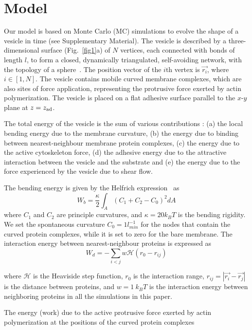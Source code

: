 \documentclass[
reprint,
superscriptaddress,
 amsmath,amssymb,
 aps,
prl,
floatfix]{revtex4-2}
\begin{document}
\section{Model} 
Our model is based on Monte Carlo (MC) simulations to evolve the shape of a vesicle in time (see Supplementary Material). The vesicle is described by a three-dimensional surface (Fig.~\ref{fig1}a) of $N$ vertices, each connected with bonds of length $l$, to form a closed, dynamically triangulated, self-avoiding network, with the topology of a sphere~\cite{Fonari2019}.
The position vector of the $i$th vertex is $\overrightarrow{r_i}$, where $i\in[1, N]$. The vesicle contains mobile curved membrane complexes, which are also sites of force application, representing the protrusive force exerted by actin polymerization. The vesicle is placed on a flat adhesive surface parallel to the $x$-$y$ plane at $z=z_{\rm ad}$. 

The total energy of the vesicle is the sum of various contributions \cite{sadhu2021modelling}: (a) the local bending energy due to the membrane curvature, (b) the energy due to binding between nearest-neighbour membrane protein complexes, (c) the energy due to the active cytoskeleton force, (d) the adhesive energy due to the attractive interaction between the vesicle and the substrate and (e) the energy due to the force experienced by the vesicle due to shear flow.

The bending energy is given by the Helfrich expression~\cite{Helfrich1973} as
\begin{equation}
    W_b=\frac{\kappa}{2}\int_A (C_1+C_2-C_0)^2 dA
    \label{eq:bending_energy}
\end{equation}
where $C_1$ and $C_2$ are principle curvatures, and $\kappa=20k_{B}T$ is the bending rigidity. We set the spontaneous curvature $C_0= 1 l_{min}^{-1}$ for the nodes that contain the curved protein complexes, while it is set to zero for the bare membrane. The interaction energy between nearest-neighbour proteins is expressed as
\begin{equation}
    W_d=-\sum_{i<j} w\mathcal{H}(r_0-r_{ij})
    \label{eq:binding_energy}
\end{equation}

where $\mathcal{H}$ is the Heaviside step function, $r_0$ is the interaction range, $r_{ij}=|\overrightarrow{r_i}-\overrightarrow{r_j}|$ is the distance between proteins, and $w=1~k_BT$ is the interaction energy between neighboring proteins in all the simulations in this paper.

The energy (work) due to the active protrusive force exerted by actin polymerization at the positions of the curved protein complexes
\end{document}
